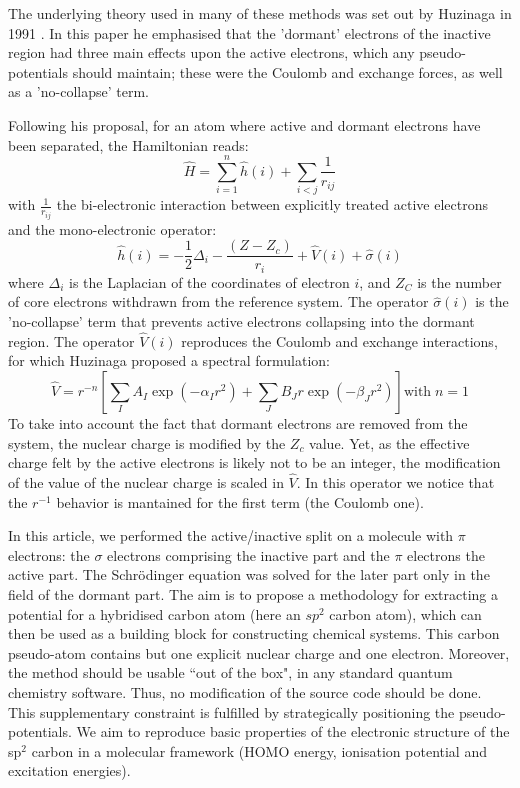 \documentclass[12pt]{article}
\begin{document}
 The underlying theory used in many of these methods was set out by Huzinaga in 1991 \cite{huzinaga_effective_1991}. In this paper he emphasised that the 'dormant' electrons of the inactive region had three main effects upon the active electrons, which any pseudo-potentials should maintain; these were the Coulomb and exchange forces, as well as a 'no-collapse' term.

Following his proposal, for an atom where active and dormant electrons have been separated, the Hamiltonian reads:
\begin{equation}
\label{eq:atomicHamiltonian}
\hat{H} = \sum_{i=1}^n \hat{h}(i) +\sum_{i<j}\frac{1}{r_{ij}}
\end{equation}
with $\frac{1}{r_{ij}}$ the bi-electronic interaction
between explicitly treated active electrons and
the mono-electronic operator:
\begin{equation}
\label{eq:monoElectronicOperator}
\hat{h}(i) = -\frac{1}{2}\Delta_i - \frac{(Z-Z_c)}{r_i}+\hat{V}(i) + \hat{\sigma}(i)
\end{equation}
where $\Delta_i$ is the Laplacian of the coordinates of electron $i$, and 
$Z_C$ is the number of core electrons withdrawn from the reference system.
The operator $\hat{\sigma}(i)$ is the 'no-collapse' term that prevents active electrons
collapsing into the dormant region. The operator $\hat{V}(i)$ reproduces the 
Coulomb and exchange interactions, for which Huzinaga proposed a spectral formulation:
\begin{equation}
\label{eq:HuzinagaMPVersion1Potential}
\hat{V} = r^{-n}\left[\sum_IA_I\exp(-\alpha_I r^2)+\sum_JB_Jr\exp(-\beta_J r^2)\right] \text{with}\;n=1
\end{equation}
To take into account the fact that dormant electrons are removed from the
system, the nuclear charge is modified by the $Z_c$ value.
Yet, as the effective charge felt by the active electrons is likely not to be an integer,
the modification of the value of the nuclear charge is scaled in $\hat{V}$.
In this operator we notice that the \(r^{-1}\) behavior is mantained for the first term 
(the Coulomb one).
%

In this article, we performed the active/inactive split on a molecule with $\pi$ electrons: the $\sigma$ electrons comprising the inactive part and the $\pi$ electrons the active part.
The Schr\"odinger equation was solved for the later part only in the field of the dormant part.
The aim is to propose a methodology for extracting a potential for a hybridised carbon atom (here an $sp^2$ carbon atom), which can then be used as a building block for constructing chemical systems. This carbon pseudo-atom contains but one explicit nuclear charge and one electron.
Moreover, the method should be usable ``out of the box", in any standard quantum chemistry software.
Thus, no modification of the source code should be done.
This supplementary constraint is fulfilled by strategically positioning the pseudo-potentials.
We aim to reproduce basic properties of the electronic structure of the sp$^2$ carbon in a molecular framework (HOMO energy, ionisation potential and excitation energies).
\end{document}
